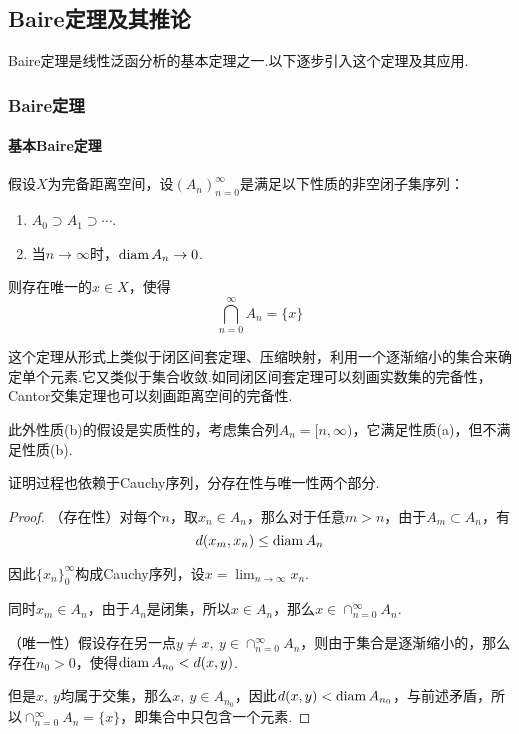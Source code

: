 \subsection{Baire定理及其推论}
Baire定理是线性泛函分析的基本定理之一.以下逐步引入这个定理及其应用.
\subsubsection{Baire定理}
\paragraph*{基本Baire定理}
\begin{theorem}[Cantor交集定理]\label{cantor-intersection}
假设$X$为完备距离空间，设$(A_n)^{\infty}_{n=0}$是满足以下性质的非空闭子集序列：

\begin{enumerate}[label=(\alph*)]
	\item $A_0\supset A_1\supset\cdots$.
	\item 当$n\rightarrow \infty$时，$\operatorname{diam} A_n\rightarrow 0$.
\end{enumerate}

则存在唯一的$x\in X$，使得
$$\bigcap_{n=0}^\infty A_n=\{x\}$$
\end{theorem}

这个定理从形式上类似于闭区间套定理、压缩映射，利用一个逐渐缩小的集合来确定单个元素.它又类似于集合收敛.如同闭区间套定理可以刻画实数集的完备性，Cantor交集定理也可以刻画距离空间的完备性.

此外性质(b)的假设是实质性的，考虑集合列$A_n=[n, \infty)$，它满足性质(a)，但不满足性质(b).

证明过程也依赖于Cauchy序列，分存在性与唯一性两个部分.

\begin{proof}
（存在性）对每个$n$，取$x_n\in A_n$，那么对于任意$m>n$，由于$A_m\subset A_n$，有
$$d(x_m,x_n)\leq \operatorname{diam} A_n$$

因此$\{x_n\}_0^\infty$构成Cauchy序列，设$x=\lim_{n\rightarrow \infty}x_n$.

同时$x_m\in A_n$，由于$A_n$是闭集，所以$x\in A_n$，那么$x\in \cap_{n=0}^\infty A_n$.

（唯一性）假设存在另一点$y\neq x,\ y\in \cap_{n=0}^\infty A_n$，则由于集合是逐渐缩小的，那么存在$n_0>0$，使得$\operatorname{diam} A_{n_0}< d(x,y)$.

但是$x,\ y$均属于交集，那么$x,\ y\in A_{n_0}$，因此$d(x,y)<\operatorname{diam} A_{n_0}$，与前述矛盾，所以$\cap_{n=0}^\infty A_n=\{x\}$，即集合中只包含一个元素.
\end{proof}

